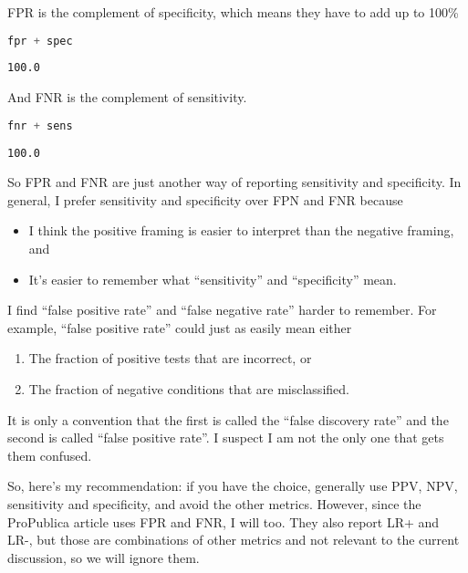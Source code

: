 FPR is the complement of specificity, which means they have to add up to
100\%

\begin{lstlisting}[language=Python,style=source]
fpr + spec
\end{lstlisting}

\begin{lstlisting}[style=output]
100.0
\end{lstlisting}

And FNR is the complement of sensitivity.

\begin{lstlisting}[language=Python,style=source]
fnr + sens
\end{lstlisting}

\begin{lstlisting}[style=output]
100.0
\end{lstlisting}

So FPR and FNR are just another way of reporting sensitivity and
specificity. In general, I prefer sensitivity and specificity over FPN
and FNR because

\begin{itemize}
\item
  I think the positive framing is easier to interpret than the negative
  framing, and
\item
  It's easier to remember what ``sensitivity'' and ``specificity'' mean.
\end{itemize}

\pagebreak

I find ``false positive rate'' and ``false negative rate'' harder to
remember. For example, ``false positive rate'' could just as easily mean
either

\begin{enumerate}
\def\labelenumi{\arabic{enumi}.}
\item
  The fraction of positive tests that are incorrect, or
\item
  The fraction of negative conditions that are misclassified.
\end{enumerate}

It is only a convention that the first is called the ``false discovery
rate'' and the second is called ``false positive rate''. I suspect I am
not the only one that gets them confused.

So, here's my recommendation: if you have the choice, generally use PPV,
NPV, sensitivity and specificity, and avoid the other metrics. However,
since the ProPublica article uses FPR and FNR, I will too. They also
report LR+ and LR-, but those are combinations of other metrics and not
relevant to the current discussion, so we will ignore them.

